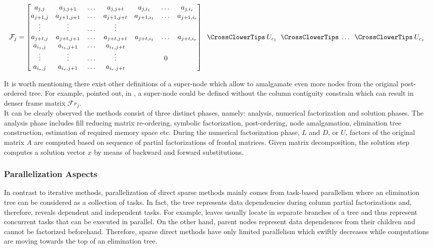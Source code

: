  \begin{equation} \label{eq:mm-10}
	\mathcal{F}_{j} = \begin{bmatrix}a_{j,j} & a_{j,j+1} & \dots & a_{j,j+t}  & a_{j,i_1} & \dots & a_{j,i_r} \\
a_{j+1,j} & a_{j+1,j+1} & \dots & a_{j+1,j+t}  & a_{j+1,i_1} & \dots & a_{j+1,i_r} \\
\vdots & \vdots & \dots & \vdots \\
a_{j+t,j}  & a_{j+t,j+1} & \dots & a_{j+t,j+t}  & a_{j+t,i_1} & \dots & a_{j+t,i_r} \\
a_{i_1,j} & a_{i_1,j+1} & \dots & a_{i_1,j+t} \\
\vdots & \vdots & \dots & \vdots  & & 0\\ 
a_{i_r,j} & a_{i_r,j+1} & \dots & a_{i_r,j+t} \\
\end{bmatrix} \extendadd U_{c_1} \extendadd \dots \extendadd U_{c_s} 
\end{equation}


It is worth mentioning there exist other definitions of a super-node which allow to amalgamate even more nodes from the original post-ordered tree. For example, \citeauthor{mult-frontal-original:2} pointed out, in \cite{mult-frontal-original:2}, a super-node could be defined without the column contiguity constrain which can result in denser frame matrix $\mathcal{F}r_{j}$.\\


It can be clearly observed the methods consist of three distinct phases, namely: analysis, numerical factorization and solution phases. The analysis phase includes fill reducing matrix re-ordering, symbolic factorization, post-ordering, node amalgamation, elimination tree construction, estimation of required memory space etc. During the numerical factorization phase, $L$ and $D$, or $U$, factors of the original matrix $A$ are computed based on sequence of partial factorizations of frontal matrices. Given matrix decomposition, the solution step computes a solution vector $x$ by means of backward and forward substitutions.\\



\subsubsection{Parallelization Aspects}
\label{subseq:direct-parallel-aspects}


In contrast to iterative methods, parallelization of direct sparse methods mainly comes from task-based parallelism where an elimination tree can be considered as a collection of tasks. In fact, the tree represents data dependencies during column partial factorizations and, therefore, reveals dependent and independent tasks. For example, leaves usually locate in separate branches of a tree and thus represent concurrent tasks that can be executed in parallel. On the other hand, parent nodes represent data dependences from their children and cannot be factorized beforehand. Therefore, sparse direct methods have only limited parallelism which swiftly decreases while computations are moving towards the top of an elimination tree.\\


